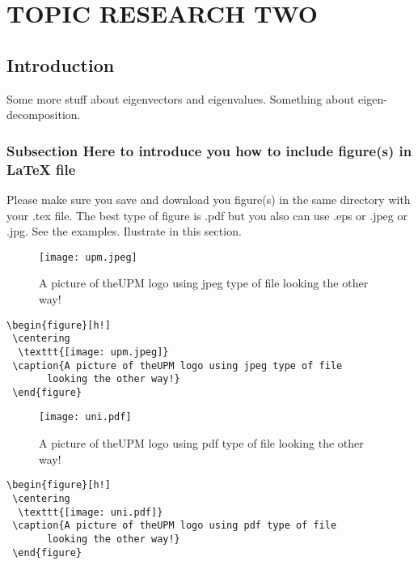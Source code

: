 \chapter{\textbf{TOPIC RESEARCH TWO}}\label{Newlabel}


\section{Introduction}

\lipsum 
Some more stuff about eigenvectors and 
eigenvalues. Something about 
eigen-decomposition. 



\subsection{ Subsection Here to introduce you how to include figure(s) in LaTeX file}

Please make sure you save and download you figure(s) in the same directory with your .tex file. The best type of figure is .pdf but you also can use .eps or .jpeg or .jpg. See the examples. Ilustrate in this section.

\begin{figure}[h!]
 \centering
  \texttt{[image: upm.jpeg]}
 \caption{A picture of theUPM logo using jpeg type of file
       looking the other way!}
 \end{figure}


\begin{verbatim}
\begin{figure}[h!]
 \centering
  \texttt{[image: upm.jpeg]}
 \caption{A picture of theUPM logo using jpeg type of file
       looking the other way!}
 \end{figure}

\end{verbatim}

\begin{figure}[h!]
 \centering
  \texttt{[image: uni.pdf]}
 \caption{A picture of theUPM logo using pdf type of file
       looking the other way!}
 \end{figure}



\begin{verbatim}
\begin{figure}[h!]
 \centering
  \texttt{[image: uni.pdf]}
 \caption{A picture of theUPM logo using pdf type of file
       looking the other way!}
 \end{figure}
\end{verbatim}

